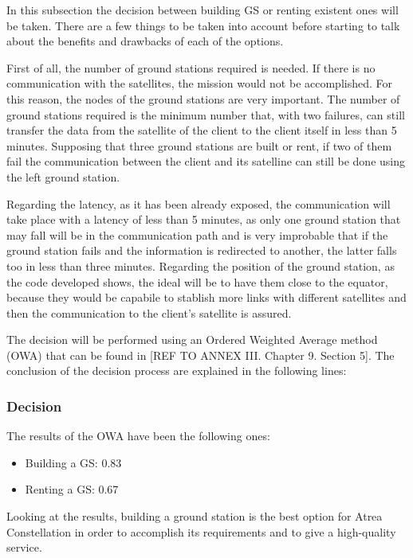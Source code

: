 In this subsection the decision between building GS or renting existent ones will be taken. There are a few things to be taken into account before starting to talk about the benefits and drawbacks of each of the options.

First of all, the number of ground stations required is needed. If there is no communication with the satellites, the mission would not be accomplished. For this reason, the nodes of the ground stations are very important. The number of ground stations required is the minimum number that, with two failures, can still transfer the data from the satellite of the client to the client itself in less than 5 minutes. Supposing that three ground stations are built or rent, if two of them fail the communication between the client and its satelline can still be done using the left ground station.

Regarding the latency, as it has been already exposed, the communication will take place with a latency of less than 5 minutes, as only one ground station that may fall will be in the communication path and is very improbable that if the ground station fails and the information is redirected to another, the latter falls too in less than three minutes. Regarding the position of the ground station, as the code developed shows, the ideal will be to have them close to the equator, because they would be capabile to stablish more links with different satellites and then the communication to the client's satellite is assured.

The decision will be performed using an Ordered Weighted Average method (OWA) that can be found in [{REF TO ANNEX III. Chapter 9. Section 5}]. The conclusion of the decision process are explained in the following lines:

\subsubsection{Decision}
The results of the OWA have been the following ones:
\begin{itemize}
\item Building a GS: 0.83
\item Renting a GS: 0.67
\end{itemize}

Looking at the results, building a ground station is the best option for Atrea Constellation in order to accomplish its requirements and to give a high-quality service.